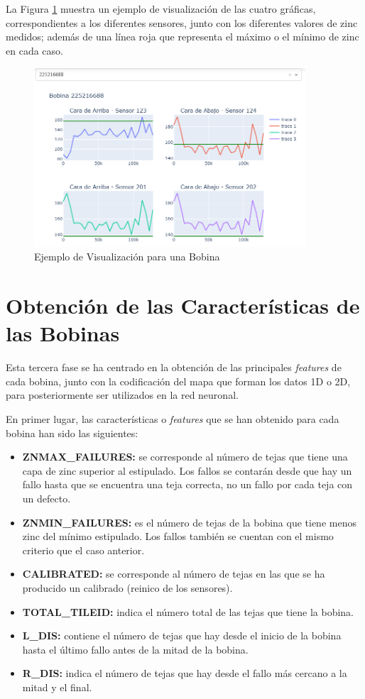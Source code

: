 La Figura \ref{f:visu} muestra un ejemplo de visualización de las cuatro gráficas, correspondientes a los diferentes sensores, junto con los diferentes valores de zinc medidos; además de una línea roja que representa el máximo o el mínimo de zinc en cada caso.

\begin{figure}[h]
 \centering
  \includegraphics[width=0.9\textwidth]{img/visuaBobi.PNG}
 \caption{Ejemplo de Visualización para una Bobina}
 \label{f:visu}
\end{figure}

\section{Obtención de las Características de las Bobinas}
Esta tercera fase se ha centrado en la obtención de las principales \emph{features} de cada bobina, junto con la codificación del mapa que forman los datos 1D o 2D, para posteriormente ser utilizados en la red neuronal. 

En primer lugar, las características o \emph{features} que se han obtenido para cada bobina han sido las siguientes:
\begin{itemize}
    \item \textbf{ZNMAX\_FAILURES:} se corresponde al número de tejas que tiene una capa de zinc superior al estipulado. Los fallos se contarán desde que hay un fallo hasta que se encuentra una teja correcta, no un fallo por cada teja con un defecto.
    \item \textbf{ZNMIN\_FAILURES:} es el número de tejas de la bobina que tiene menos zinc del mínimo estipulado. Los fallos también se cuentan con el mismo criterio que el caso anterior.
    \item \textbf{CALIBRATED:} se corresponde al número de tejas en las que se ha producido un calibrado (reinico de los sensores).
    \item \textbf{TOTAL\_TILEID:} indica el número total de las tejas que tiene la bobina.
    \item \textbf{L\_DIS:} contiene el número de tejas que hay desde el inicio de la bobina hasta el último fallo antes de la mitad de la bobina.
    \item \textbf{R\_DIS:} indica el número de tejas que hay desde el fallo más cercano a la mitad y el final.
\end{itemize}

